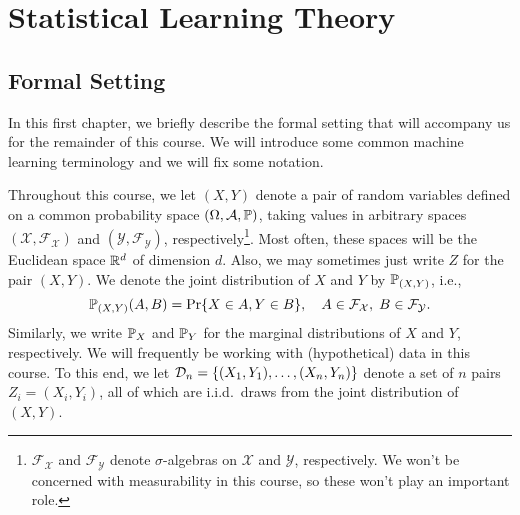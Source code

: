 \part{Statistical Learning Theory}

\chapter{Formal Setting}
\label{ch: formal setting}

In this first chapter, we briefly describe the formal setting that will accompany us for the remainder of this course. We will introduce some common machine learning terminology and we will fix some notation.

Throughout this course, we let $(X, Y)$ denote a pair of random variables defined on a common probability space $(\Omega, \mathcal{A}, \P)$, taking values in arbitrary spaces $(\mathcal{X}, \mathcal{F}_{\mathcal{X}})$ and $(\mathcal{Y}, \mathcal{F}_{\mathcal{Y}})$, respectively\footnote{$\mathcal{F}_{\mathcal{X}}$ and $\mathcal{F}_{\mathcal{Y}}$ denote $\sigma$-algebras on $\mathcal{X}$ and $\mathcal{Y}$, respectively. We won't be concerned with measurability in this course, so these won't play an important role.}. Most often, these spaces will be the Euclidean space $\R^d$ of dimension $d$. Also, we may sometimes just write $Z$ for the pair $(X, Y)$. We denote the joint distribution of $X$ and $Y$ by $\P_{(X, Y)}$, i.e.,
\[
    \P_{(X, Y)}(A, B) = \Pr{X \in A, Y \in B}, \quad A \in \mathcal{F}_{\mathcal{X}}, \; B \in \mathcal{F}_{\mathcal{Y}}.
\]
Similarly, we write $\P_X$ and $\P_Y$ for the marginal distributions of $X$ and $Y$, respectively. We will frequently be working with (hypothetical) data in this course. To this end, we let $\mathcal{D}_n = \set{(X_1, Y_1), \dots, (X_n, Y_n)}$ denote a set of $n$ pairs $Z_i = (X_i, Y_i)$, all of which are i.i.d.\ draws from the joint distribution of $(X, Y)$.
